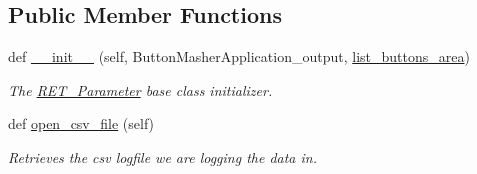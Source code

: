 \subsection*{Public Member Functions}
\begin{DoxyCompactItemize}
\item 
def \hyperlink{classRET__Parameter_1_1RET__Parameter_acaff5a3a7b875ffce45f9c16a3f191d6}{\+\_\+\+\_\+init\+\_\+\+\_\+} (self, Button\+Masher\+Application\+\_\+output, \hyperlink{classRET__Parameter_1_1RET__Parameter_ac4848af5696d2d98e426d3d775d6964d}{list\+\_\+buttons\+\_\+area})
\begin{DoxyCompactList}\small\item\em The \hyperlink{classRET__Parameter_1_1RET__Parameter}{R\+E\+T\+\_\+\+Parameter} base class initializer. \end{DoxyCompactList}\item 
def \hyperlink{classRET__Parameter_1_1RET__Parameter_a6b5778a011cd40b8302107493f8212c3}{open\+\_\+csv\+\_\+file} (self)
\begin{DoxyCompactList}\small\item\em Retrieves the csv logfile we are logging the data in. \end{DoxyCompactList}\end{DoxyCompactItemize}
